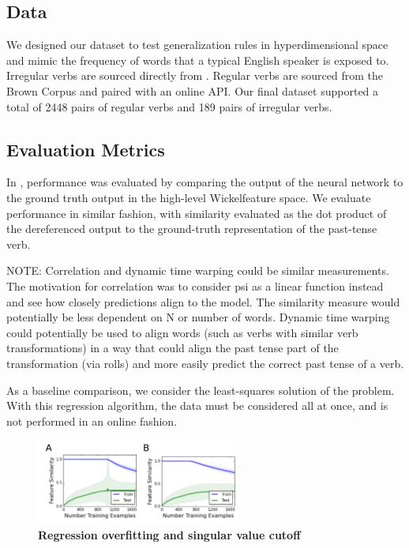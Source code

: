 \documentclass{article}
\begin{document}
\subsection{Data}
We designed our dataset to test generalization rules in hyperdimensional space and mimic the frequency of words that a typical English speaker is exposed to. Irregular verbs are sourced directly from \citet{Rumelhart1986a}. Regular verbs are sourced from the Brown Corpus and paired with an online API. Our final dataset supported a total of 2448 pairs of regular verbs and 189 pairs of irregular verbs. 
    
\subsection{Evaluation Metrics}

In \citet{Rumelhart1986a}, performance was evaluated by comparing the output of the neural network to the ground truth output in the high-level Wickelfeature space. We evaluate performance in similar fashion, with similarity evaluated as the dot product of the dereferenced output to the ground-truth representation of the past-tense verb. 

NOTE: Correlation and dynamic time warping could be similar measurements. The motivation for correlation was to consider psi as a linear function instead and see how closely predictions align to the model. The similarity measure would potentially be less dependent on N or number of words. Dynamic time warping could potentially be used to align words (such as verbs with similar verb transformations) in a way that could align the past tense part of the transformation (via rolls) and more easily predict the correct past tense of a verb.

As a baseline comparison, we consider the least-squares solution of the problem. With this regression algorithm, the data must be considered all at once, and is not performed in an online fashion.

\begin{figure}
\centering
\includegraphics[width=0.6\textwidth]{regression_issue-170518.png}
\caption{\textbf{Regression overfitting and singular value cutoff}}
\end{figure}
\end{document}
